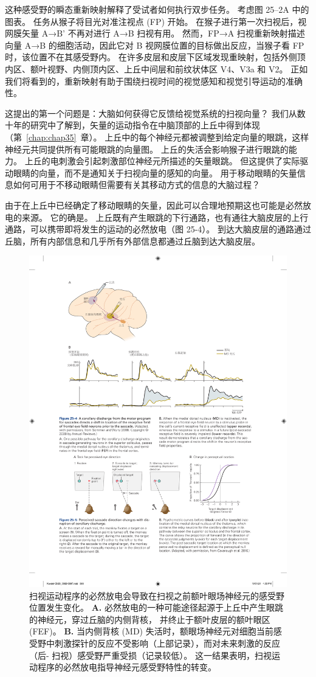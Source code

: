 这种感受野的瞬态重新映射解释了受试者如何执行双步任务。
考虑图 25–2A 中的图表。
任务从猴子将目光对准注视点 (FP) 开始。
在猴子进行第一次扫视后，视网膜矢量 A→B' 不再对进行 A→B 扫视有用。
然而，FP→A 扫视重新映射描述向量 A→B 的细胞活动，因此它对 B 视网膜位置的目标做出反应，当猴子看 FP 时，该位置不在其感受野内。
在许多皮层和皮层下区域发现重映射，包括外侧顶内区、额叶视野、内侧顶内区、上丘中间层和前纹状体区 V4、V3a 和 V2。
正如我们将看到的，重新映射有助于围绕扫视时间的视觉感知和视觉引导运动的准确性。


这提出的第一个问题是：大脑如何获得它反馈给视觉系统的扫视向量？
我们从数十年的研究中了解到，矢量的运动指令在中脑顶部的上丘中得到体现（第~\ref{chap:chap35}~章）。
上丘中的每个神经元都被调整到给定向量的眼跳，这样神经元共同提供所有可能眼跳的向量图。
上丘的失活会影响猴子进行眼跳的能力。
上丘的电刺激会引起刺激部位神经元所描述的矢量眼跳。 
但这提供了实际驱动眼睛的向量，而不是通知关于扫视向量的感知的向量。
用于移动眼睛的矢量信息如何可用于不移动眼睛但需要有关其移动方式的信息的大脑过程？


由于在上丘中已经确定了移动眼睛的矢量，因此可以合理地预期这也可能是必然放电的来源。
它的确是。
上丘既有产生眼跳的下行通路，也有通往大脑皮层的上行通路，可以携带即将发生的运动的必然放电（图 25-4）。
到达大脑皮层的通路通过丘脑，所有内部信息和几乎所有外部信息都通过丘脑到达大脑皮层。


\begin{figure}[htbp]
	\centering
	\includegraphics[width=0.8\linewidth]{chap25/fig_25_4}
	\caption{扫视运动程序的必然放电会导致在扫视之前额叶眼场神经元的感受野位置发生变化\cite{sommer2008brain}。
		\textbf{A.} 必然放电的一种可能途径起源于上丘中产生眼跳的神经元，穿过丘脑的内侧背核， 并终止于额叶皮层的额叶眼区 (FEF)。
		\textbf{B.} 当内侧背核 (MD) 失活时，额眼场神经元对细胞当前感受野中刺激探针的反应不受影响（上部记录），而对未来刺激的反应（后- 扫视）感受野严重受损（记录较低）。
		这一结果表明，扫视运动程序的必然放电指导神经元感受野特性的转变。}
	\label{fig:25_4}
\end{figure}


